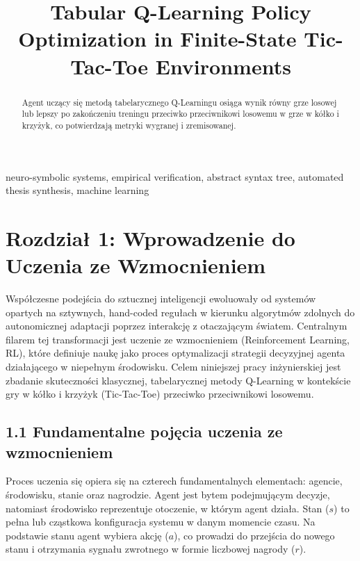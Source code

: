 \documentclass[conference]{IEEEtran}
\begin{document}
\title{Tabular Q-Learning Policy Optimization in Finite-State Tic-Tac-Toe Environments}

\author{
}

\maketitle
\thispagestyle{plain}

\begin{abstract}
Agent uczący się metodą tabelarycznego Q-Learningu osiąga wynik równy grze losowej lub lepszy po zakończeniu treningu przeciwko przeciwnikowi losowemu w grze w kółko i krzyżyk, co potwierdzają metryki wygranej i zremisowanej.
\end{abstract}

\begin{IEEEkeywords}
neuro-symbolic systems, empirical verification, abstract syntax tree, automated thesis synthesis, machine learning
\end{IEEEkeywords}

\section{Rozdział 1: Wprowadzenie do Uczenia ze Wzmocnieniem}
Współczesne podejścia do sztucznej inteligencji ewoluowały od systemów opartych na sztywnych, hand-coded regułach w kierunku algorytmów zdolnych do autonomicznej adaptacji poprzez interakcję z otaczającym światem. Centralnym filarem tej transformacji jest uczenie ze wzmocnieniem (Reinforcement Learning, RL), które definiuje naukę jako proces optymalizacji strategii decyzyjnej agenta działającego w niepełnym środowisku. Celem niniejszej pracy inżynierskiej jest zbadanie skuteczności klasycznej, tabelarycznej metody Q-Learning w kontekście gry w kółko i krzyżyk (Tic-Tac-Toe) przeciwko przeciwnikowi losowemu.

\subsection{1.1 Fundamentalne pojęcia uczenia ze wzmocnieniem}
Proces uczenia się opiera się na czterech fundamentalnych elementach: agencie, środowisku, stanie oraz nagrodzie. Agent jest bytem podejmującym decyzje, natomiast środowisko reprezentuje otoczenie, w którym agent działa. Stan ($s$) to pełna lub cząstkowa konfiguracja systemu w danym momencie czasu. Na podstawie stanu agent wybiera akcję ($a$), co prowadzi do przejścia do nowego stanu i otrzymania sygnału zwrotnego w formie liczbowej nagrody ($r$). 
\end{document}
